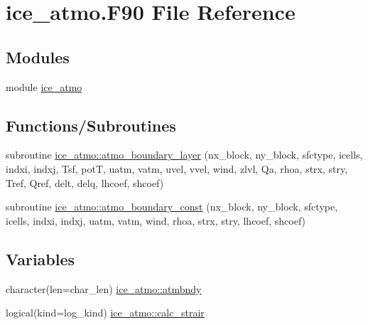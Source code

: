 \hypertarget{ice__atmo_8F90}{
\section{ice\_\-atmo.F90 File Reference}
\label{ice__atmo_8F90}
}
\subsection*{Modules}
\begin{DoxyCompactItemize}
\item 
module \hyperlink{namespaceice__atmo}{ice\_\-atmo}
\end{DoxyCompactItemize}
\subsection*{Functions/Subroutines}
\begin{DoxyCompactItemize}
\item 
subroutine \hyperlink{namespaceice__atmo_a0064e438c4aa02621fad02322d62875a}{ice\_\-atmo::atmo\_\-boundary\_\-layer} (nx\_\-block, ny\_\-block, sfctype, icells, indxi, indxj, Tsf, potT, uatm, vatm, uvel, vvel, wind, zlvl, Qa, rhoa, strx, stry, Tref, Qref, delt, delq, lhcoef, shcoef)
\item 
subroutine \hyperlink{namespaceice__atmo_a7f029ec02aa35ba56d71f83914b70a76}{ice\_\-atmo::atmo\_\-boundary\_\-const} (nx\_\-block, ny\_\-block, sfctype, icells, indxi, indxj, uatm, vatm, wind, rhoa, strx, stry, lhcoef, shcoef)
\end{DoxyCompactItemize}
\subsection*{Variables}
\begin{DoxyCompactItemize}
\item 
character(len=char\_\-len) \hyperlink{namespaceice__atmo_aae4bd7119f41531a5beba8ea5f03c805}{ice\_\-atmo::atmbndy}
\item 
logical(kind=log\_\-kind) \hyperlink{namespaceice__atmo_a114305e959bca27e073f74995bf55855}{ice\_\-atmo::calc\_\-strair}
\end{DoxyCompactItemize}
